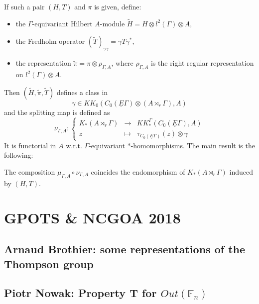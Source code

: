 \begin{itemize}
If such a pair $(H,T)$ and $\pi$ is given, define:\\

\begin{itemize}
\item the $\Gamma$-equivariant Hilbert $A$-module $\tilde H  = H\otimes l^2(\Gamma)\otimes A$,
\item the Fredholm operator $(\tilde T)_{\gamma\gamma} = \gamma T \gamma^*$,
\item the representation $\tilde \pi = \pi \otimes \rho_{\Gamma,A}$, where $\rho_{\Gamma,A}$ is the right regular representation on $l^2(\Gamma)\otimes A$.\\
\end{itemize}

Then $(\tilde H, \tilde \pi, \tilde T)$ defines a class in 
\[\gamma\in KK_0(C_0(\underline E\Gamma) \otimes (A\rtimes_r \Gamma), A)\] 
and the splitting map is defined as
\[\nu_{\Gamma,A} : \left\{ \begin{array}{rcl}
K_*(A\rtimes_r \Gamma) & \rightarrow & KK_*^\Gamma(C_0(\underline E \Gamma ), A) \\
z & \mapsto & \tau_{C_0(\underline E\Gamma)}(z)\otimes \gamma 
\end{array}\right.\]
It is functorial in $A$ w.r.t. $\Gamma$-equivariant $*$-homomorphisms. The main result is the following:\\

\begin{thm}
The composition $\mu_{\Gamma,A}\circ \nu_{\Gamma,A}$ coincides the endomorphism of $K_*(A\rtimes_r \Gamma)$ induced by $(H,T)$.
\end{thm}

\end{itemize}

\section{GPOTS \& NCGOA 2018}

\subsection{Arnaud Brothier: some representations of the Thompson group}

\subsection{Piotr Nowak: Property T for $Out(\mathbb F_n)$}

